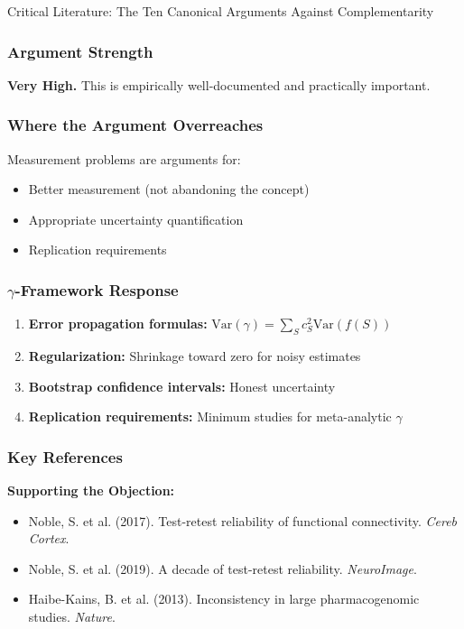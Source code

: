 \begin{chapter}{Critical Literature: The Ten Canonical Arguments Against Complementarity}
\subsubsection{Argument Strength}

\textbf{Very High.} This is empirically well-documented and practically important.

\subsubsection{Where the Argument Overreaches}

Measurement problems are arguments for:
\begin{itemize}[noitemsep]
    \item Better measurement (not abandoning the concept)
    \item Appropriate uncertainty quantification
    \item Replication requirements
\end{itemize}

\subsubsection{$\gamma$-Framework Response}

\begin{enumerate}
    \item \textbf{Error propagation formulas:} $\text{Var}(\gamma) = \sum_S c_S^2 \text{Var}(f(S))$
    \item \textbf{Regularization:} Shrinkage toward zero for noisy estimates
    \item \textbf{Bootstrap confidence intervals:} Honest uncertainty
    \item \textbf{Replication requirements:} Minimum studies for meta-analytic $\gamma$
\end{enumerate}

\subsubsection{Key References}

\textbf{Supporting the Objection:}
\begin{itemize}[noitemsep]
    \item Noble, S. et al. (2017). Test-retest reliability of functional connectivity. \textit{Cereb Cortex}.
    \item Noble, S. et al. (2019). A decade of test-retest reliability. \textit{NeuroImage}.
    \item Haibe-Kains, B. et al. (2013). Inconsistency in large pharmacogenomic studies. \textit{Nature}.
\end{itemize}


\end{chapter}
